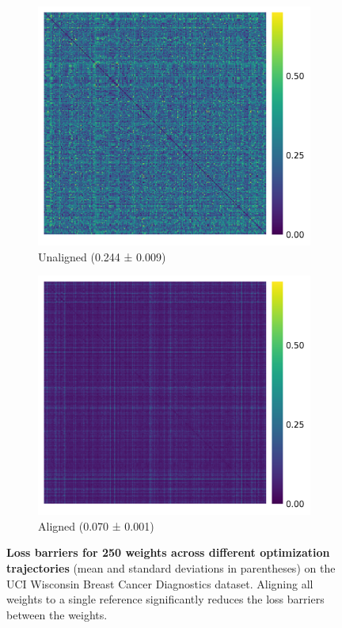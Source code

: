 \begin{figure}[t!]
    \centering
    \begin{subfigure}{0.47\linewidth}
        \centering
        \includegraphics[width=\linewidth]{figures/uci_17/uci_17_unaligned.png}
        \caption{Unaligned (0.244 ± 0.009)}
        \label{fig:uci_unaligned}
    \end{subfigure}
    \begin{subfigure}{0.47\linewidth}
        \centering
        \includegraphics[width=\linewidth]{figures/uci_17/uci_17_aligned.png}
        \caption{Aligned (0.070 ± 0.001)}
        \label{fig:uci_aligned}
    \end{subfigure}
    \caption{\label{fig:uci_alignment}\textbf{Loss barriers for 250 weights across different optimization trajectories} (mean and standard deviations in parentheses) on the UCI Wisconsin Breast Cancer Diagnostics dataset. Aligning all weights to a single reference significantly reduces the loss barriers between the weights. } 
\end{figure}

